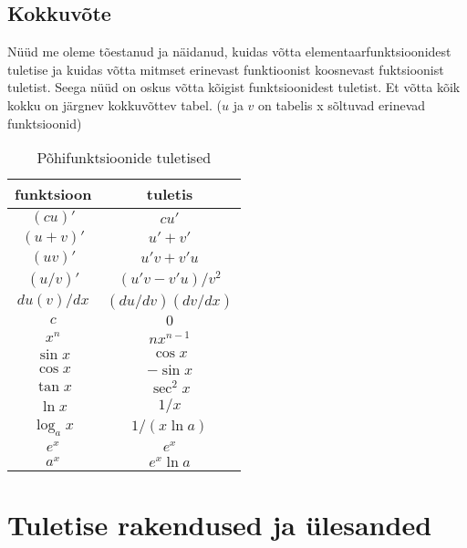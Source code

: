 \documentclass[a4paper,11pt,twocolumn]{article}
\begin{document}
\subsection{Kokkuvõte}
Nüüd me oleme tõestanud ja näidanud, kuidas võtta elementaarfunktsioonidest tuletise ja kuidas võtta mitmset erinevast funktioonist koosnevast fuktsioonist tuletist. Seega nüüd on oskus võtta kõigist funktsioonidest tuletist. Et võtta kõik kokku on järgnev kokkuvõttev tabel. ($u$ ja $v$ on tabelis x sõltuvad erinevad funktsioonid)

\begin{table}[h]
  \centering
  \caption{Põhifunktsioonide tuletised}
  \begin{tabular}{c | c}
    \hline
    funktsioon & tuletis\\
    \hline
    $(cu)'$ & $cu'$\\
    $(u+v)'$ & $u'+v'$\\
    $(uv)'$ & $u'v+v'u$\\
    $(u/v)'$ & $(u'v-v'u)/v^2$\\
    $du(v)/dx$ & $(du/dv)(dv/dx)$\\
    \hline
    $c$ & $0$\\
    $x^n$ & $nx^{n-1}$ \\
    $\sin x$ & $\cos x$\\
    $\cos x$ & $-\sin x$\\
    $\tan x$ & $\sec^2 x$\\
    $\ln x$ & $1/x$\\
    $\log_a x$ & $1/(x\ln a)$\\
    $e^x$ & $e^x$\\
    $a^x$ & $e^x\ln a$    
  \end{tabular}
\end{table}

\section{Tuletise rakendused ja ülesanded}
\end{document}

